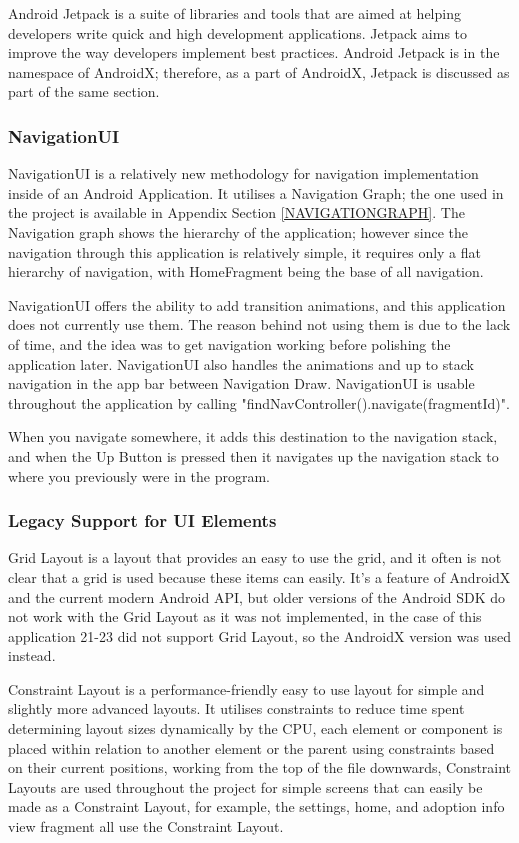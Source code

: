         Android Jetpack is a suite of libraries and tools that are aimed at helping developers write quick and high development applications. Jetpack aims to improve the way developers implement best practices. Android Jetpack is in the namespace of AndroidX; therefore, as a part of AndroidX, Jetpack is discussed as part of the same section.
        \subsubsection{NavigationUI} \label{NAVUI}
        NavigationUI is a relatively new methodology for navigation implementation inside of an Android Application. It utilises a Navigation Graph; the one used in the project is available in Appendix Section \ref{NAVIGATIONGRAPH}. The Navigation graph shows the hierarchy of the application; however since the navigation through this application is relatively simple, it requires only a flat hierarchy of navigation, with HomeFragment being the base of all navigation.
        
        NavigationUI offers the ability to add transition animations, and this application does not currently use them. The reason behind not using them is due to the lack of time, and the idea was to get navigation working before polishing the application later. NavigationUI also handles the animations and up to stack navigation in the app bar between Navigation Draw. NavigationUI is usable throughout the application by calling "findNavController().navigate(fragmentId)".
        
        When you navigate somewhere, it adds this destination to the navigation stack, and when the \gls{Up Button} is pressed then it navigates up the navigation stack to where you previously were in the program.
        
        \subsubsection{Legacy Support for UI Elements} \label{LEGACYUI}
        Grid Layout is a layout that provides an easy to use the grid, and it often is not clear that a grid is used because these items can easily. It's a feature of AndroidX and the current modern Android API, but older versions of the Android SDK do not work with the Grid Layout as it was not implemented, in the case of this application 21-23 did not support Grid Layout, so the AndroidX version was used instead.
        
        Constraint Layout is a performance-friendly easy to use layout for simple and slightly more advanced layouts. It utilises constraints to reduce time spent determining layout sizes dynamically by the CPU, each element or component is placed within relation to another element or the parent using constraints based on their current positions, working from the top of the file downwards, Constraint Layouts are used throughout the project for simple screens that can easily be made as a Constraint Layout, for example, the settings, home, and adoption info view fragment all use the Constraint Layout.

